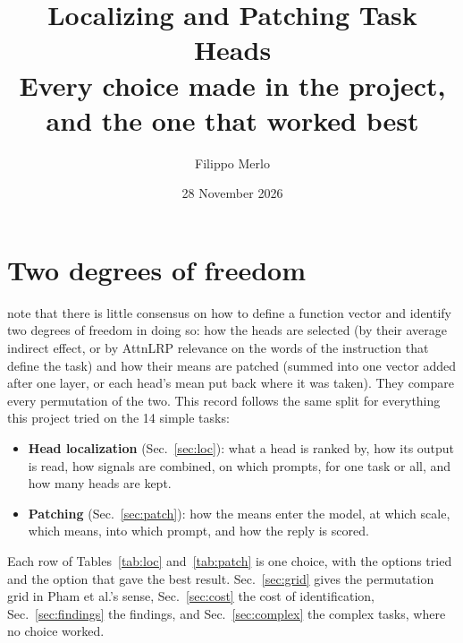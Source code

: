 \documentclass[10pt,a4paper]{article}
\title{Localizing and Patching Task Heads\\[3pt]
\large Every choice made in the project, and the one that worked best}
\author{Filippo Merlo}
\date{28 November 2026}
\begin{document}
\maketitle
\vspace{-1em}

\section{Two degrees of freedom}\label{sec:frame}

\citet{pham2026fast} note that there is little consensus on how to define a function vector and identify two degrees of freedom in doing so: how the heads are selected (by their average indirect effect, or by AttnLRP relevance on the words of the instruction that define the task) and how their means are patched (summed into one vector added after one layer, or each head's mean put back where it was taken). They compare every permutation of the two. This record follows the same split for everything this project tried on the 14 simple tasks:
\begin{itemize}
\item \textbf{Head localization} (Sec.~\ref{sec:loc}): what a head is ranked by, how its output is read, how signals are combined, on which prompts, for one task or all, and how many heads are kept.
\item \textbf{Patching} (Sec.~\ref{sec:patch}): how the means enter the model, at which scale, which means, into which prompt, and how the reply is scored.
\end{itemize}
Each row of Tables~\ref{tab:loc} and~\ref{tab:patch} is one choice, with the options tried and the option that gave the best result. Sec.~\ref{sec:grid} gives the permutation grid in Pham et al.'s sense, Sec.~\ref{sec:cost} the cost of identification, Sec.~\ref{sec:findings} the findings, and Sec.~\ref{sec:complex} the complex tasks, where no choice worked.
\end{document}
